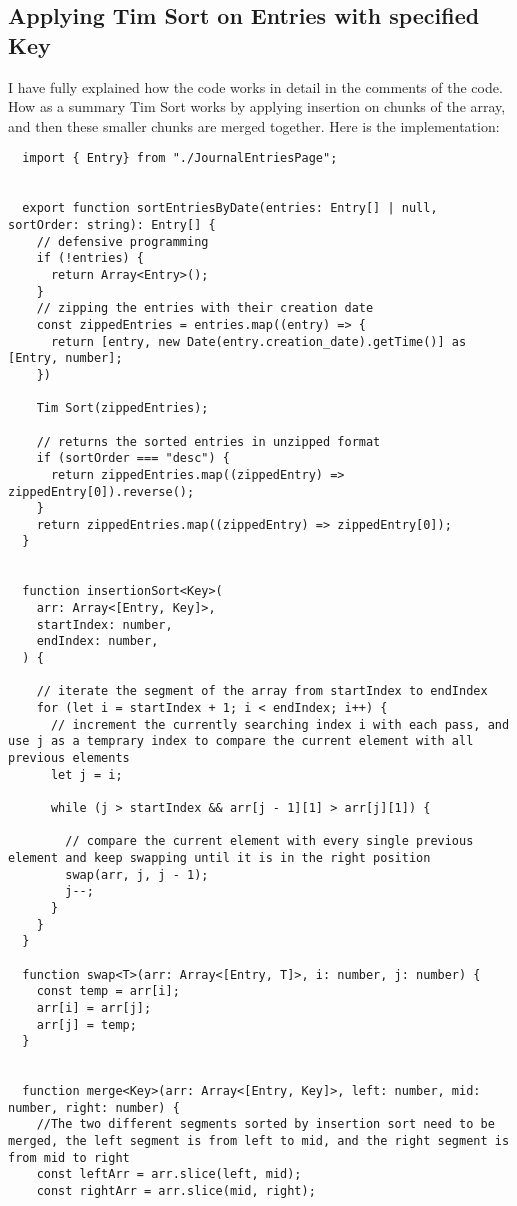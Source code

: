 \subsection{Applying Tim Sort on Entries with specified Key}
I have fully explained how the code works in detail in the comments of the code. How as a summary Tim Sort works by applying insertion on chunks of the array, and then these smaller chunks are merged together. Here is the implementation:
\begin{verbatim}
  import { Entry} from "./JournalEntriesPage";


  export function sortEntriesByDate(entries: Entry[] | null, sortOrder: string): Entry[] {
    // defensive programming
    if (!entries) {
      return Array<Entry>();
    }
    // zipping the entries with their creation date
    const zippedEntries = entries.map((entry) => {
      return [entry, new Date(entry.creation_date).getTime()] as [Entry, number];
    })
  
    Tim Sort(zippedEntries);
  
    // returns the sorted entries in unzipped format
    if (sortOrder === "desc") {
      return zippedEntries.map((zippedEntry) => zippedEntry[0]).reverse();
    }
    return zippedEntries.map((zippedEntry) => zippedEntry[0]);
  }
  
  
  function insertionSort<Key>(
    arr: Array<[Entry, Key]>,
    startIndex: number,
    endIndex: number,
  ) {
  
    // iterate the segment of the array from startIndex to endIndex
    for (let i = startIndex + 1; i < endIndex; i++) {
      // increment the currently searching index i with each pass, and use j as a temprary index to compare the current element with all previous elements
      let j = i;
  
      while (j > startIndex && arr[j - 1][1] > arr[j][1]) {
  
        // compare the current element with every single previous element and keep swapping until it is in the right position
        swap(arr, j, j - 1);
        j--;
      }
    }
  }
  
  function swap<T>(arr: Array<[Entry, T]>, i: number, j: number) {
    const temp = arr[i];
    arr[i] = arr[j];
    arr[j] = temp;
  }
  
  
  function merge<Key>(arr: Array<[Entry, Key]>, left: number, mid: number, right: number) {
    //The two different segments sorted by insertion sort need to be merged, the left segment is from left to mid, and the right segment is from mid to right
    const leftArr = arr.slice(left, mid);
    const rightArr = arr.slice(mid, right);
  

\end{verbatim}
